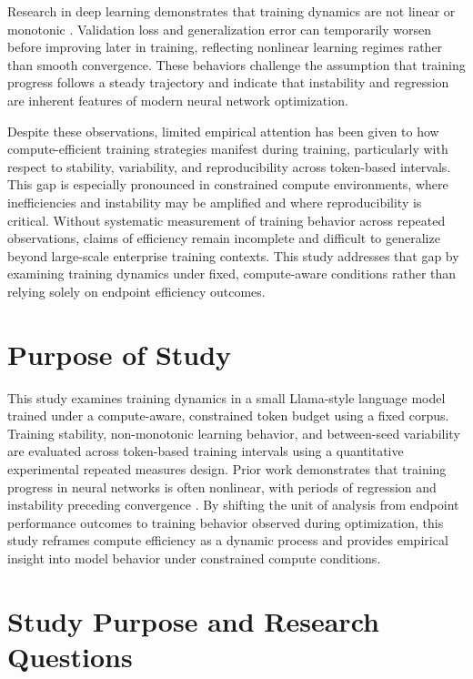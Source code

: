 \documentclass{article}
\begin{document}
Research in deep learning demonstrates that training dynamics are not linear or monotonic \citep{Belkin2019BiasVariance,Nakkiran2019DeepDoubleDescent}. Validation loss and generalization error can temporarily worsen before improving later in training, reflecting nonlinear learning regimes rather than smooth convergence. These behaviors challenge the assumption that training progress follows a steady trajectory and indicate that instability and regression are inherent features of modern neural network optimization.

Despite these observations, limited empirical attention has been given to how compute-efficient training strategies manifest during training, particularly with respect to stability, variability, and reproducibility across token-based intervals. This gap is especially pronounced in constrained compute environments, where inefficiencies and instability may be amplified and where reproducibility is critical. Without systematic measurement of training behavior across repeated observations, claims of efficiency remain incomplete and difficult to generalize beyond large-scale enterprise training contexts. This study addresses that gap by examining training dynamics under fixed, compute-aware conditions rather than relying solely on endpoint efficiency outcomes.

\section{Purpose of Study}
This study examines training dynamics in a small Llama-style language model trained under a compute-aware, constrained token budget using a fixed corpus. Training stability, non-monotonic learning behavior, and between-seed variability are evaluated across token-based training intervals using a quantitative experimental repeated measures design. Prior work demonstrates that training progress in neural networks is often nonlinear, with periods of regression and instability preceding convergence \citep{Belkin2019BiasVariance,Nakkiran2019DeepDoubleDescent}. By shifting the unit of analysis from endpoint performance outcomes to training behavior observed during optimization, this study reframes compute efficiency as a dynamic process and provides empirical insight into model behavior under constrained compute conditions.

\section{Study Purpose and Research Questions}
\end{document}
